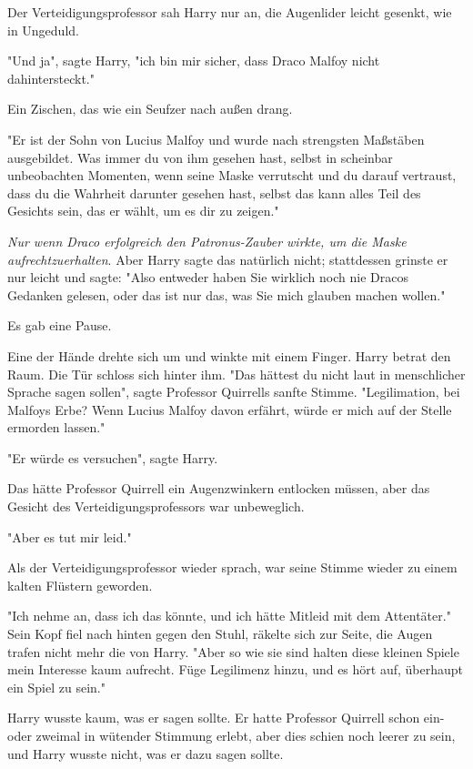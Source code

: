 {Der Verteidigungsprofessor sah Harry nur an, die Augenlider leicht gesenkt, wie in Ungeduld.

"Und ja", sagte Harry, "ich bin mir sicher, dass Draco Malfoy nicht dahintersteckt."

Ein Zischen, das wie ein Seufzer nach außen drang.

"Er ist der Sohn von Lucius Malfoy und wurde nach strengsten Maßstäben ausgebildet. Was immer du von ihm gesehen hast, selbst in scheinbar unbeobachten Momenten, wenn seine Maske verrutscht und du darauf vertraust, dass du die Wahrheit darunter gesehen hast, selbst das kann alles Teil des Gesichts sein, das er wählt, um es dir zu zeigen."

\emph{Nur wenn Draco erfolgreich den Patronus-Zauber wirkte, um die Maske aufrechtzuerhalten}. Aber Harry sagte das natürlich nicht; stattdessen grinste er nur leicht und sagte: "Also entweder haben Sie wirklich noch nie Dracos Gedanken gelesen, oder das ist nur das, was Sie mich glauben machen wollen."

Es gab eine Pause.

Eine der Hände drehte sich um und winkte mit einem Finger. Harry betrat den Raum. Die Tür schloss sich hinter ihm. "Das hättest du nicht laut in menschlicher Sprache sagen sollen", sagte Professor Quirrells sanfte Stimme. "Legilimation, bei Malfoys Erbe? Wenn Lucius Malfoy davon erfährt, würde er mich auf der Stelle ermorden lassen."

"Er würde es versuchen", sagte Harry.

Das hätte Professor Quirrell ein Augenzwinkern entlocken müssen, aber das Gesicht des Verteidigungsprofessors war unbeweglich.

"Aber es tut mir leid."

Als der Verteidigungsprofessor wieder sprach, war seine Stimme wieder zu einem kalten Flüstern geworden.

"Ich nehme an, dass ich das könnte, und ich hätte Mitleid mit dem Attentäter." Sein Kopf fiel nach hinten gegen den Stuhl, räkelte sich zur Seite, die Augen trafen nicht mehr die von Harry. "Aber so wie sie sind halten diese kleinen Spiele mein Interesse kaum aufrecht. Füge Legilimenz hinzu, und es hört auf, überhaupt ein Spiel zu sein."

Harry wusste kaum, was er sagen sollte. Er hatte Professor Quirrell schon ein- oder zweimal in wütender Stimmung erlebt, aber dies schien noch leerer zu sein, und Harry wusste nicht, was er dazu sagen sollte.

}

